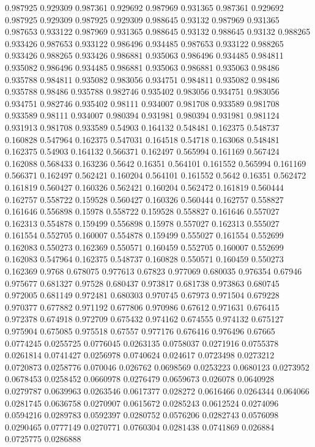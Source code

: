 0.987925 0.929309
0.987361 0.929692
0.987969 0.931365
0.987361 0.929692
0.987925 0.929309
0.987925 0.929309
0.988645 0.93132
0.987969 0.931365
0.987653 0.933122
0.987969 0.931365
0.988645 0.93132
0.988645 0.93132
0.988265 0.933426
0.987653 0.933122
0.986496 0.934485
0.987653 0.933122
0.988265 0.933426
0.988265 0.933426
0.986881 0.935063
0.986496 0.934485
0.984811 0.935082
0.986496 0.934485
0.986881 0.935063
0.986881 0.935063
0.98486 0.935788
0.984811 0.935082
0.983056 0.934751
0.984811 0.935082
0.98486 0.935788
0.98486 0.935788
0.982746 0.935402
0.983056 0.934751
0.983056 0.934751
0.982746 0.935402
0.98111 0.934007
0.981708 0.933589
0.981708 0.933589
0.98111 0.934007
0.980394 0.931981
0.980394 0.931981
0.981124 0.931913
0.981708 0.933589
0.54903 0.164132
0.548481 0.162375
0.548737 0.160828
0.547964 0.162375
0.547031 0.164518
0.54718 0.163068
0.548481 0.162375
0.54903 0.164132
0.566371 0.162497
0.565994 0.161169
0.567424 0.162088
0.568433 0.163236
0.5642 0.16351
0.564101 0.161552
0.565994 0.161169
0.566371 0.162497
0.562421 0.160204
0.564101 0.161552
0.5642 0.16351
0.562472 0.161819
0.560427 0.160326
0.562421 0.160204
0.562472 0.161819
0.560444 0.162757
0.558722 0.159528
0.560427 0.160326
0.560444 0.162757
0.558827 0.161646
0.556898 0.15978
0.558722 0.159528
0.558827 0.161646
0.557027 0.162313
0.554878 0.159499
0.556898 0.15978
0.557027 0.162313
0.555027 0.161554
0.552705 0.160007
0.554878 0.159499
0.555027 0.161554
0.552699 0.162083
0.550273 0.162369
0.550571 0.160459
0.552705 0.160007
0.552699 0.162083
0.547964 0.162375
0.548737 0.160828
0.550571 0.160459
0.550273 0.162369
0.9768 0.678075
0.977613 0.67823
0.977069 0.680035
0.976354 0.67946
0.975677 0.681327
0.97528 0.680437
0.973817 0.681738
0.973863 0.680745
0.972005 0.681149
0.972481 0.680303
0.970745 0.67973
0.971504 0.679228
0.970377 0.677882
0.971192 0.677806
0.970986 0.67612
0.971631 0.676415
0.972378 0.674918
0.972709 0.675432
0.974162 0.674555
0.974132 0.675127
0.975904 0.675085
0.975518 0.67557
0.977176 0.676416
0.976496 0.67665
0.0774245 0.0255725
0.0776045 0.0263135
0.0758037 0.0271916
0.0755378 0.0261814
0.0741427 0.0256978
0.0740624 0.024617
0.0723498 0.0273212
0.0720873 0.0258776
0.070046 0.026762
0.0698569 0.0253223
0.0680123 0.0273952
0.0678453 0.0258452
0.0660978 0.0276479
0.0659673 0.026078
0.0640928 0.0279787
0.0639963 0.0263546
0.0617377 0.028272
0.0616466 0.0264344
0.064066 0.0281745
0.0636758 0.0270907
0.0615672 0.0285243
0.0612524 0.0274096
0.0594216 0.0289783
0.0592397 0.0280752
0.0576206 0.0282743
0.0576098 0.0290465
0.0777149 0.0270771
0.0760304 0.0281438
0.0741869 0.026884
0.0725775 0.0286888
